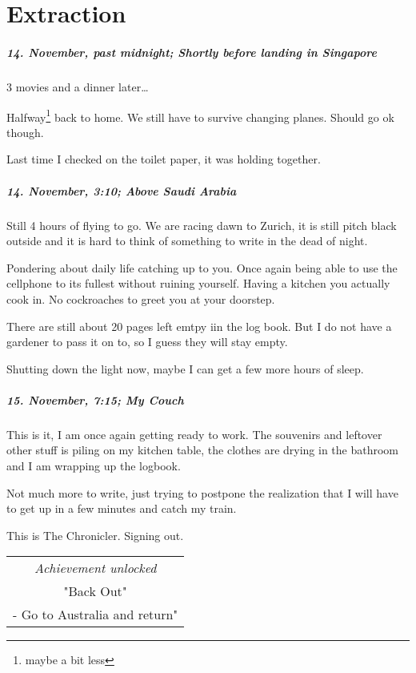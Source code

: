 \chapter{Extraction}


\paragraph{14. November, past midnight; Shortly before landing in Singapore}
3 movies and a dinner later\ldots{}

Halfway\footnote{maybe a bit less} back to home.
We still have to survive changing planes.
Should go ok though.

Last time I checked on the toilet paper, it was holding together.

\paragraph{14. November, 3:10; Above Saudi Arabia}
Still 4 hours of flying to go.
We are racing dawn to Zurich, it is still pitch black outside and it is hard to think of something to write in the dead of night.

Pondering about daily life catching up to you.
Once again being able to use the cellphone to its fullest without ruining yourself.
Having a kitchen you actually cook in.
No cockroaches to greet you at your doorstep.

There are still about 20 pages left emtpy iin the log book.
But I do not have a gardener to pass it on to, so I guess they will stay empty.

Shutting down the light now, maybe I can get a few more hours of sleep.

\paragraph{15. November, 7:15; My Couch}
This is it, I am once again getting ready to work.
The souvenirs and leftover other stuff is piling on my kitchen table, the clothes are drying in the bathroom and I am wrapping up the logbook.

Not much more to write, just trying to postpone the realization that I will have to get up in a few minutes and catch my train.

This is The Chronicler.
Signing out.

\begin{center}
\begin{tabular}{||c||}
\emph{Achievement unlocked}\\
"Back Out"\\
\multicolumn{1}{||p{0.8\textwidth}||}{\footnotesize - Go to Australia and return"} \\
\end{tabular}
\end{center}
